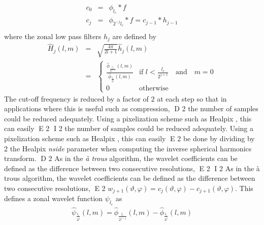 \begin{eqnarray}
c_0   & = &  \phi_{ l_{c} }  * f    \nonumber    \\
c_j    &=&   \phi_{2^{-j}  l_{c}  }  * f  =   c_{j-1} * h_{j-1} \nonumber    \\
\end{eqnarray}
where the zonal low pass filters $h_{j}$ are defined by 
\begin{eqnarray}
 \hat{H}_{j}(l,m)  & =  &  \sqrt{\frac{4\pi}{2l+1} }  \hat h_{j}(l,m)  \nonumber \\
 &  =  & \left\{
  \begin{array}{ll}
  \frac {   \hat \phi_{\frac{l_{c}}{2^{j+1}} }(l,m)   }   {  \hat  \phi_{  \frac{l_{c}}{2^{j}} }(l,m)   } & \mbox{if }  l  < \frac{ l_{c}} {2^{j+1}} \quad \textrm{and}\quad m = 0\\
0 & \mbox{otherwise } \ 
  \end{array}
  \right.
\end{eqnarray}
The cut-off frequency is reduced by a factor of $2$ at each step so that in applications where this is useful such as compression, 
D 2
the number of samples could be reduced adequately. Using a pixelization scheme such as Healpix \cite{pixel:healpix}, this can easily 
E 2
I 2
the number of samples could be reduced adequately. Using a pixelization scheme such as Healpix \citep{pixel:healpix}, this can easily 
E 2
be done by dividing by 2 the Healpix {\it nside} parameter when computing the inverse spherical harmonics transform. 
D 2
As in the \emph{\`a trous} algorithm, the wavelet coefficients can be defined as the difference between two consecutive resolutions, 
E 2
I 2
As in the \og{}\`a trous \fg{} algorithm, the wavelet coefficients can be defined as the difference between two consecutive resolutions, 
E 2
$w_{j+1}(\vartheta, \varphi) = c_{j}(\vartheta, \varphi) - c_{j+1}(\vartheta, \varphi)$. This defines a zonal wavelet function $\psi_{l_c}$ as 
\begin{eqnarray}\label{wavelet}
\hat \psi_{\frac{l_c}{2^{j}}}(l,m) = \hat \phi_{\frac{l_c}{2^{j-1}}} (l,m)  - \hat \phi_{\frac{l_c}{2^{j}}}(l,m)
\end{eqnarray}

